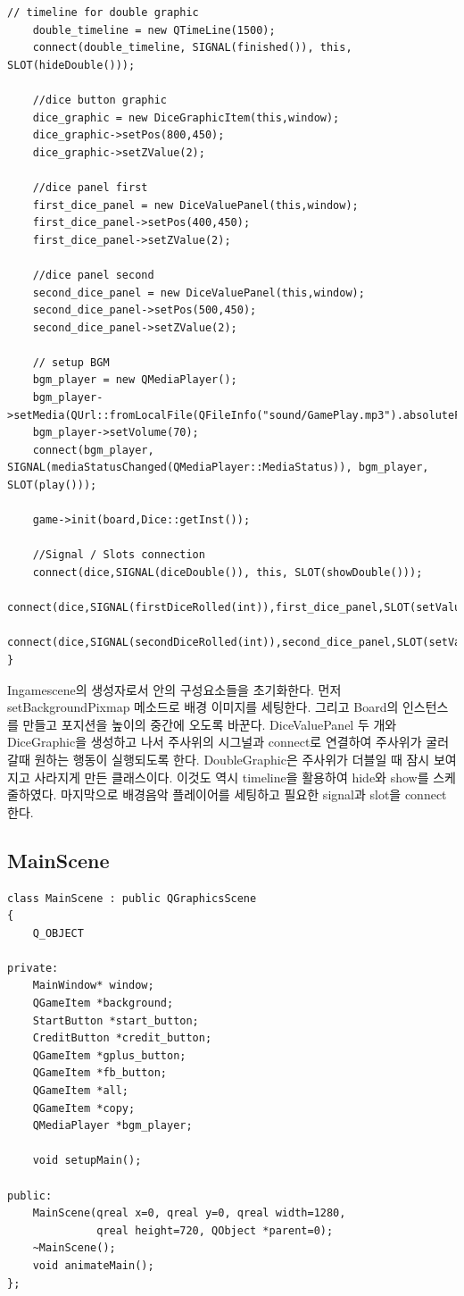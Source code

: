 \documentclass[10pt,oneside,a4paper,titlepage]{article}
\begin{document}
\begin{lstlisting}[frame=single,caption=
{Ingamescene setup},label=code:FD,captionpos=b,framexleftmargin=10pt,escapeinside=~~]
    // timeline for double graphic
    double_timeline = new QTimeLine(1500);
    connect(double_timeline, SIGNAL(finished()), this, SLOT(hideDouble()));

    //dice button graphic
    dice_graphic = new DiceGraphicItem(this,window);
    dice_graphic->setPos(800,450);
    dice_graphic->setZValue(2);

    //dice panel first
    first_dice_panel = new DiceValuePanel(this,window);
    first_dice_panel->setPos(400,450);
    first_dice_panel->setZValue(2);

    //dice panel second
    second_dice_panel = new DiceValuePanel(this,window);
    second_dice_panel->setPos(500,450);
    second_dice_panel->setZValue(2);

    // setup BGM
    bgm_player = new QMediaPlayer();
    bgm_player->setMedia(QUrl::fromLocalFile(QFileInfo("sound/GamePlay.mp3").absoluteFilePath()));
    bgm_player->setVolume(70);
    connect(bgm_player, SIGNAL(mediaStatusChanged(QMediaPlayer::MediaStatus)), bgm_player, SLOT(play()));

    game->init(board,Dice::getInst());

    //Signal / Slots connection
    connect(dice,SIGNAL(diceDouble()), this, SLOT(showDouble()));
    connect(dice,SIGNAL(firstDiceRolled(int)),first_dice_panel,SLOT(setValue(int)));
    connect(dice,SIGNAL(secondDiceRolled(int)),second_dice_panel,SLOT(setValue(int)));
}
\end{lstlisting}

Ingamescene의 생성자로서 안의 구성요소들을 초기화한다. 먼저 setBackgroundPixmap 메소드로 배경 이미지를 세팅한다. 그리고 Board의 인스턴스를 만들고 포지션을 높이의 중간에 오도록 바꾼다. DiceValuePanel 두 개와 DiceGraphic을 생성하고 나서 주사위의 시그널과 connect로 연결하여 주사위가 굴러갈때 원하는 행동이 실행되도록 한다. DoubleGraphic은 주사위가 더블일 때 잠시 보여지고 사라지게 만든 클래스이다. 이것도 역시 timeline을 활용하여 hide와 show를 스케줄하였다. 마지막으로 배경음악 플레이어를 세팅하고 필요한 signal과 slot을 connect한다.


\subsection{MainScene}



\begin{lstlisting}
class MainScene : public QGraphicsScene
{
    Q_OBJECT

private:
    MainWindow* window;
    QGameItem *background;
    StartButton *start_button;
    CreditButton *credit_button;
    QGameItem *gplus_button;
    QGameItem *fb_button;
    QGameItem *all;
    QGameItem *copy;
    QMediaPlayer *bgm_player;

    void setupMain();

public:
    MainScene(qreal x=0, qreal y=0, qreal width=1280,
              qreal height=720, QObject *parent=0);
    ~MainScene();
    void animateMain();
};
\end{lstlisting}
\end{document}
